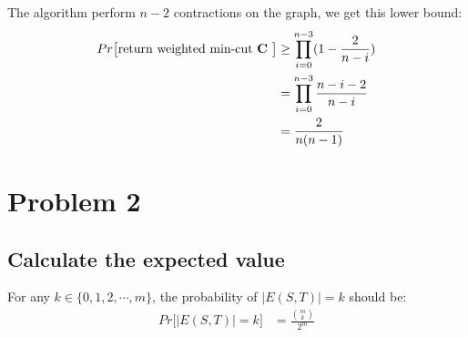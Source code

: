 \documentclass[a4paper, 12pt, titlepage]{article}
\begin{document}
The algorithm perform $n - 2$ contractions on the graph, we get this lower bound:
\begin{equation}
    \begin{aligned}
        Pr \big[ \text{return weighted min-cut \textbf{C} }\big] &\geq \prod_{i = 0}^{n - 3} (1 - \frac{2}{n - i}) \\
                                                 &= \prod_{i = 0}^{n - 3} \frac{ n - i - 2}{n - i} \\
                                                 &= \frac{2}{n ( n - 1)}
    \end{aligned}
\end{equation}


\section{Problem 2}

\subsection{Calculate the expected value }



For any $k \in \{  0, 1, 2, \cdots, m \}$, the probability of $|E(S, T)| = k$ should be:
\begin{equation}
    \begin{aligned}
        Pr \big[ |E(S, T)| = k \big] &= \frac{\binom{m}{k}}{2^{m}}
    \end{aligned}
\end{equation}
\end{document}
